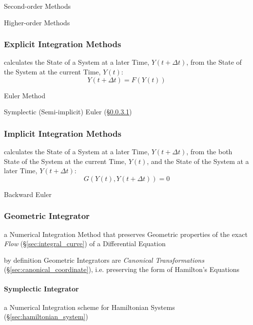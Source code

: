 Second-order Methods

Higher-order Methods



\subsubsection{Explicit Integration Methods}\label{sec:explicit_integration}

calculates the State of a System at a later Time, $Y(t + \Delta{t})$, from the
State of the System at the current Time, $Y(t)$:
\[
  Y(t + \Delta{t}) = F(Y(t))
\]

Euler Method

\fist Symplectic (Semi-implicit) Euler (\S\ref{sec:symplectic_integrator})



\subsubsection{Implicit Integration Methods}\label{sec:implicit_integration}

calculates the State of a System at a later Time, $Y(t + \Delta{t})$, from the
both State of the System at the current Time, $Y(t)$, and the State of the
System at a later Time, $Y(t + \Delta{t})$:
\[
  G(Y(t), Y(t + \Delta{t})) = 0
\]

Backward Euler



\subsubsection{Geometric Integrator}\label{sec:geometric_integrator}

a Numerical Integration Method that preserves Geometric properties of the exact
\emph{Flow} (\S\ref{sec:integral_curve}) of a Differential Equation

by definition Geometric Integrators are \emph{Canonical Transformations}
(\S\ref{sec:canonical_coordinate}), i.e. preserving the form of Hamilton's
Equations



\paragraph{Symplectic Integrator}\label{sec:symplectic_integrator}\hfill

a Numerical Integration scheme for Hamiltonian Systems
(\S\ref{sec:hamiltonian_system})

